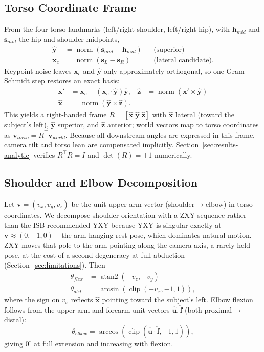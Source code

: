 \documentclass[conference]{IEEEtran}
\begin{document}
\subsection{Torso Coordinate Frame}
From the four torso landmarks (left/right shoulder, left/right hip), with
$\mathbf{h}_{mid}$ and $\mathbf{s}_{mid}$ the hip and shoulder midpoints,
\begin{align}
\hat{\mathbf{y}} &= \operatorname{norm}(\mathbf{s}_{mid} - \mathbf{h}_{mid}) &&\text{(superior)}\\
\mathbf{x}_{c} &= \operatorname{norm}(\mathbf{s}_{L} - \mathbf{s}_{R}) &&\text{(lateral candidate)}.
\end{align}
Keypoint noise leaves $\mathbf{x}_c$ and $\hat{\mathbf{y}}$ only
approximately orthogonal, so one Gram-Schmidt step restores an exact
basis:
\begin{align}
\mathbf{x}' &= \mathbf{x}_c - (\mathbf{x}_c\cdot\hat{\mathbf{y}})\hat{\mathbf{y}}, &
\hat{\mathbf{z}} &= \operatorname{norm}(\mathbf{x}' \times \hat{\mathbf{y}}) \\
\hat{\mathbf{x}} &= \operatorname{norm}(\hat{\mathbf{y}} \times \hat{\mathbf{z}}). &&
\end{align}
This yields a right-handed frame
$R = [\hat{\mathbf{x}}\;\hat{\mathbf{y}}\;\hat{\mathbf{z}}]$ with
$\hat{\mathbf{x}}$ lateral (toward the subject's left),
$\hat{\mathbf{y}}$ superior, and $\hat{\mathbf{z}}$ anterior; world
vectors map to torso coordinates as
$\mathbf{v}_{torso} = R^{\!\top}\mathbf{v}_{world}$. Because all
downstream angles are expressed in this frame, camera tilt and torso lean
are compensated implicitly. Section~\ref{sec:results-analytic} verifies
$R^{\!\top}R = I$ and $\det(R) = +1$ numerically.

\subsection{Shoulder and Elbow Decomposition}
\label{sec:angles}
Let $\mathbf{v} = (v_x, v_y, v_z)$ be the unit upper-arm vector
(shoulder$\to$elbow) in torso coordinates. We decompose shoulder
orientation with a ZXY sequence rather than the ISB-recommended YXY
because YXY is singular exactly at $\mathbf{v}\approx(0,-1,0)$ -- the
arm-hanging rest pose, which dominates natural motion. ZXY moves that
pole to the arm pointing along the camera axis, a rarely-held pose, at
the cost of a second degeneracy at full abduction
(Section~\ref{sec:limitations}). Then
\begin{align}
\theta_{flex} &= \operatorname{atan2}(-v_z, -v_y) \\
\theta_{abd} &= \arcsin(\operatorname{clip}(-v_x, -1, 1)),
\end{align}
where the sign on $v_x$ reflects $\hat{\mathbf{x}}$ pointing toward the
subject's left. Elbow flexion follows from the upper-arm and forearm unit
vectors $\hat{\mathbf{u}}, \hat{\mathbf{f}}$ (both proximal$\to$distal):
\begin{equation}
\theta_{elbow} = \arccos(\operatorname{clip}(\hat{\mathbf{u}}\cdot\hat{\mathbf{f}}, -1, 1)),
\end{equation}
giving $0^\circ$ at full extension and increasing with flexion.
\end{document}
